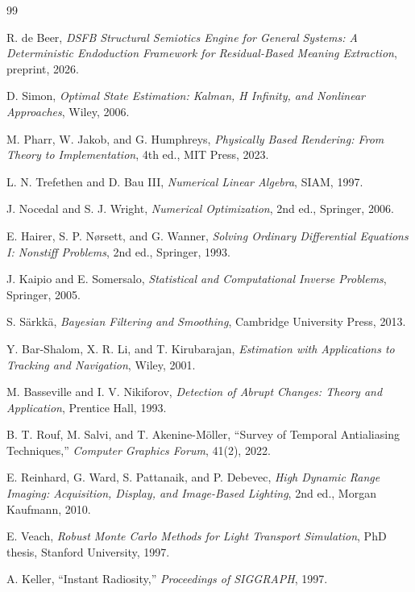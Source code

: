\documentclass[11pt]{article}
\theoremstyle{definition}
\theoremstyle{plain}
\begin{document}
\begin{thebibliography}{99}

R. de Beer,
\emph{DSFB Structural Semiotics Engine for General Systems: A Deterministic Endoduction Framework for Residual-Based Meaning Extraction},
preprint, 2026.

D. Simon,
\emph{Optimal State Estimation: Kalman, H Infinity, and Nonlinear Approaches},
Wiley, 2006.

M. Pharr, W. Jakob, and G. Humphreys,
\emph{Physically Based Rendering: From Theory to Implementation},
4th ed., MIT Press, 2023.

L. N. Trefethen and D. Bau III,
\emph{Numerical Linear Algebra},
SIAM, 1997.

J. Nocedal and S. J. Wright,
\emph{Numerical Optimization},
2nd ed., Springer, 2006.

E. Hairer, S. P. N\o rsett, and G. Wanner,
\emph{Solving Ordinary Differential Equations I: Nonstiff Problems},
2nd ed., Springer, 1993.

J. Kaipio and E. Somersalo,
\emph{Statistical and Computational Inverse Problems},
Springer, 2005.

S. S\"arkk\"a,
\emph{Bayesian Filtering and Smoothing},
Cambridge University Press, 2013.

Y. Bar-Shalom, X. R. Li, and T. Kirubarajan,
\emph{Estimation with Applications to Tracking and Navigation},
Wiley, 2001.

M. Basseville and I. V. Nikiforov,
\emph{Detection of Abrupt Changes: Theory and Application},
Prentice Hall, 1993.

B. T. Rouf, M. Salvi, and T. Akenine-M\"oller,
``Survey of Temporal Antialiasing Techniques,''
\emph{Computer Graphics Forum}, 41(2), 2022.

E. Reinhard, G. Ward, S. Pattanaik, and P. Debevec,
\emph{High Dynamic Range Imaging: Acquisition, Display, and Image-Based Lighting},
2nd ed., Morgan Kaufmann, 2010.

E. Veach,
\emph{Robust Monte Carlo Methods for Light Transport Simulation},
PhD thesis, Stanford University, 1997.

A. Keller,
``Instant Radiosity,''
\emph{Proceedings of SIGGRAPH}, 1997.


\end{thebibliography}
\end{document}
